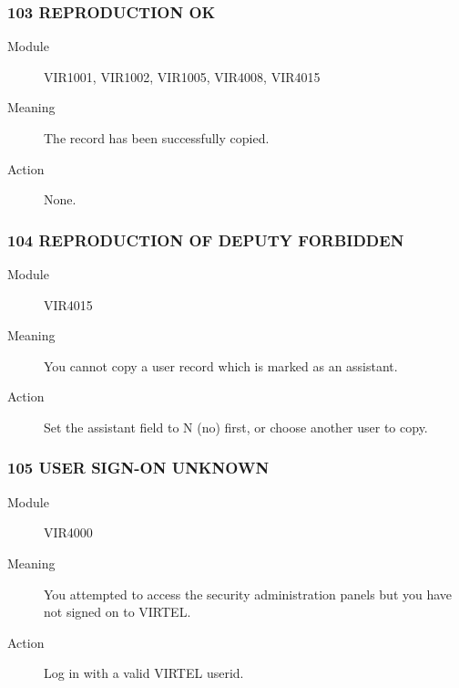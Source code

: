\documentclass[letterpaper,10pt,english]{sphinxmanual}
\begin{document}
\subsubsection{103 REPRODUCTION OK}
\label{\detokenize{messages:reproduction-ok}}\begin{description}
\item[{Module}] \leavevmode
VIR1001, VIR1002, VIR1005, VIR4008, VIR4015

\item[{Meaning}] \leavevmode
The record has been successfully copied.

\item[{Action}] \leavevmode
None.

\end{description}


\subsubsection{104 REPRODUCTION OF DEPUTY FORBIDDEN}
\label{\detokenize{messages:reproduction-of-deputy-forbidden}}\begin{description}
\item[{Module}] \leavevmode
VIR4015

\item[{Meaning}] \leavevmode
You cannot copy a user record which is marked as an assistant.

\item[{Action}] \leavevmode
Set the assistant field to N (no) first, or choose another user to copy.

\end{description}


\subsubsection{105 USER SIGN-ON UNKNOWN}
\label{\detokenize{messages:user-sign-on-unknown}}\begin{description}
\item[{Module}] \leavevmode
VIR4000

\item[{Meaning}] \leavevmode
You attempted to access the security administration panels but you have not signed on to VIRTEL.

\item[{Action}] \leavevmode
Log in with a valid VIRTEL userid.

\end{description}
\end{document}

